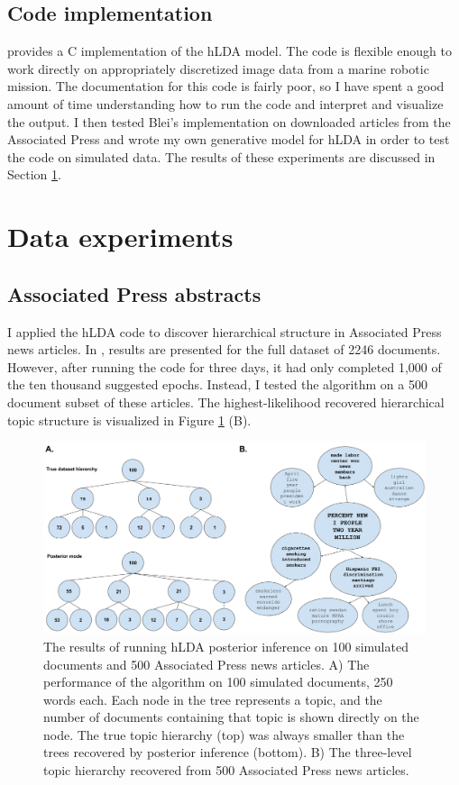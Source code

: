 \documentclass{article}
\begin{document}
\subsection{Code implementation}
\citet{Blei2010} provides a C implementation of the hLDA model. The code is flexible enough to work directly on appropriately discretized image data from a marine robotic mission. The documentation for this code is fairly poor, so I have spent a good amount of time understanding how to run the code and interpret and visualize the output. I then tested Blei's implementation on downloaded articles from the Associated Press and wrote my own generative model for hLDA in order to test the code on simulated data. The results of these experiments are discussed in Section \ref{sec:exp}.

\section{Data experiments}
\label{sec:exp}
\subsection{Associated Press abstracts}
I applied the hLDA code to discover hierarchical structure in Associated Press news articles. In \citet{Blei2010}, results are presented for the full dataset of 2246 documents. However, after running the code for three days, it had only completed 1,000 of the ten thousand suggested epochs. Instead, I tested the algorithm on a 500 document subset of these articles. The highest-likelihood recovered hierarchical topic structure is visualized in Figure \ref{fig:sim} (B).

\begin{figure}[h]
  \centering
    \includegraphics[scale=0.25]{sim}
  \caption{The results of running hLDA posterior inference on 100 simulated documents and 500 Associated Press news articles. A) The performance of the algorithm on 100 simulated documents, 250 words each. Each node in the tree represents a topic, and the number of documents containing that topic is shown directly on the node. The true topic hierarchy (top) was always smaller than the trees recovered by posterior inference (bottom). B) The three-level topic hierarchy recovered from 500 Associated Press news articles.}
  \label{fig:sim}
\end{figure}
\end{document}
